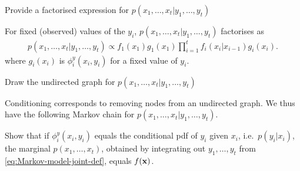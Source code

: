 \begin{exenumerate}
  
\item Provide a factorised expression for $ p(x_1, \ldots, x_t | y_1, \ldots, y_t)$

  \begin{solution}
    For fixed (observed) values of the $y_i$, $p(x_1, \ldots, x_t |
    y_1, \ldots, y_t)$ factorises as
    \begin{align}
      p(x_1, \ldots, x_t | y_1, \ldots, y_t) \propto f_1(x_1) g_1(x_1)
      \prod_{i=1}^t f_i(x_i|x_{i-1}) g_i(x_i).
    \end{align}
    where $g_i(x_i)$ is $\phi^y_i(x_i,y_i)$ for a fixed value of $y_i$. 
  \end{solution}

\item Draw the undirected graph for $p(x_1, \ldots, x_t | y_1, \ldots, y_t)$
  \begin{solution}
    Conditioning corresponds to removing nodes from an undirected
    graph. We thus have the following Markov chain for $p(x_1, \ldots,
    x_t | y_1, \ldots, y_t)$.

\begin{center}
\end{center}
   
 \end{solution}

\item Show that if $\phi_i^y(x_i, y_i)$ equals the conditional pdf of
  $y_i$ given $x_i$, i.e.\ $p(y_i|x_i)$, the marginal $p(x_1, \ldots, x_t)$,
  obtained by integrating out $y_1, \ldots, y_t$ from
  \eqref{eq:Markov-model-joint-def}, equals $f(\mathbf{x})$.


\end{exenumerate}
